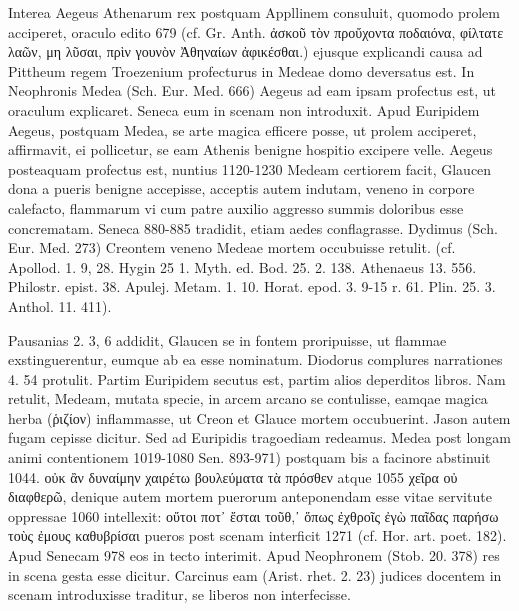 \documentclass[landscape, a4paper, 11pt, oneside, polutonikogreek, german]{article}
\begin{document}
Interea Aegeus Athenarum rex postquam Appllinem consuluit, quomodo prolem acciperet, oraculo edito 679 (cf. Gr. Anth. ἀσκοῦ τὸν προὔχοντα ποδαιόνα, φίλτατε λαῶν, μη λῦσαι, πρὶν γουνὸν Ἀθηναίων ἀφικέσθαι.) ejusque explicandi causa ad Pittheum regem Troezenium profecturus in Medeae domo deversatus est. In Neophronis Medea (Sch. Eur. Med. 666) Aegeus ad eam ipsam profectus est, ut oraculum explicaret. Seneca eum in scenam non introduxit. Apud Euripidem Aegeus, postquam Medea, se arte magica efficere posse, ut prolem acciperet, affirmavit, ei pollicetur, se eam Athenis benigne hospitio excipere velle. Aegeus posteaquam profectus est, nuntius 1120-1230 Medeam certiorem facit, Glaucen dona a pueris benigne accepisse, acceptis autem indutam, veneno in corpore calefacto, flammarum vi cum patre auxilio aggresso summis doloribus esse concrematam. Seneca 880-885 tradidit, etiam aedes conflagrasse. Dydimus (Sch. Eur. Med. 273) Creontem veneno Medeae mortem occubuisse retulit. (cf. Apollod. 1. 9, 28. Hygin 25 1. Myth. ed. Bod. 25. 2. 138. Athenaeus 13. 556. Philostr. epist. 38. Apulej. Metam. 1. 10. Horat. epod. 3. 9-15 r. 61. Plin. 25. 3. Anthol. 11. 411).

Pausanias 2. 3, 6 addidit, Glaucen se in fontem proripuisse, ut flammae exstinguerentur, eumque ab ea esse nominatum. Diodorus complures narrationes 4. 54 protulit. Partim Euripidem secutus est, partim alios deperditos libros. Nam retulit, Medeam, mutata specie, in arcem arcano se contulisse, eamqae magica herba (ῥιζίον) inflammasse, ut Creon et Glauce mortem occubuerint. Jason autem fugam cepisse dicitur. Sed ad Euripidis tragoediam redeamus. Medea post longam animi contentionem 1019-1080 Sen. 893-971) postquam bis a facinore abstinuit 1044. οὐκ ἂν δυναίμην χαιρέτω βουλεύματα τὰ πρόσθεν atque 1055 χεῖρα οὐ διαφθερῶ, denique autem mortem puerorum anteponendam esse vitae servitute oppressae 1060 intellexit: οὔτοι ποτ᾽ ἔσται τοῦθ,᾽ ὅπως ἐχθροῖς ἐγὼ παῖδας παρήσω τοὺς ἐμους καθυβρίσαι pueros post scenam interficit 1271 (cf. Hor. art. poet. 182). Apud Senecam 978 eos in tecto interimit. Apud Neophronem (Stob. 20. 378) res in scena gesta esse dicitur. Carcinus eam (Arist. rhet. 2. 23) judices docentem in scenam introduxisse traditur, se liberos non interfecisse.
\end{document}
